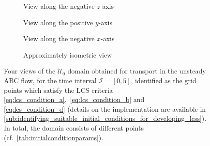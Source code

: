 \begin{figure}[htpb]
    \centering
    \hspace*{\fill}
    \begin{subfigure}[b]{0.43\textwidth}
        \centering
        \caption[]{{\small View along the negative $z$-axis}}
        \label{fig:unsteady_abd_z}
    \end{subfigure}\hfill%
    \begin{subfigure}[b]{0.43\textwidth}
        \centering
        \caption[]{{\small View along the positive $y$-axis}}
        \label{fig:unsteady_abd_y}
    \end{subfigure}%
    \hspace*{\fill}

    \hspace*{\fill}
    \begin{subfigure}[b]{0.43\textwidth}
        \centering
        \caption[]{{\small View along the negative $x$-axis}}
        \label{fig:unsteady_abd_x}
    \end{subfigure}\hfill%
    \begin{subfigure}[b]{0.43\textwidth}
        \centering
        \caption[]{{\small Approximately isometric view}}
        \label{fig:unsteady_abd_isometric}
    \end{subfigure}%
    \hspace*{\fill}
    \caption[Four views of the $\mathcal{U}_{0}$ domain obtained for transport
    in the unsteady ABC flow]
    {
        Four views of the $\mathcal{U}_{0}$ domain obtained for transport in the
        unsteady ABC flow, for the time interval $\mathcal{I}=[0,5]$,
        identified as the grid points which satisfy the LCS criteria
        \eqref{eq:lcs_condition_a},~\eqref{eq:lcs_condition_b} and~
        \eqref{eq:lcs_condition_d} (details on the implementation are available
        in
        \cref{sub:identifying_suitable_initial_conditions_for_developing_lcss}).
        In total, the domain consists of  different points
        (cf.\ \cref{tab:initialconditionparams}).
}
    \label{fig:unsteady_abd}
\end{figure}

